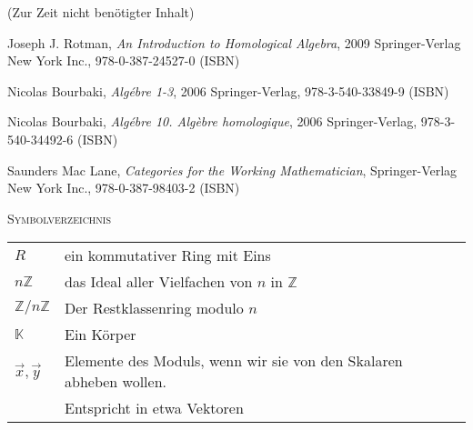 \documentclass[a4paper]{amsart}
\theoremstyle{definition}
\newcommand{\Z}{\ensuremath{\mathbb{ Z }}}
\newcommand{\K}{\ensuremath{\mathbb{ K }}}
\newcommand{\zz}[1]{\ensuremath{\Z /#1\Z}}
\begin{document}
\begin{backup}
    (Zur Zeit nicht benötigter Inhalt)
\end{backup}

\begin{thebibliography}{9}
   	Joseph J. Rotman, \emph{An Introduction to Homological Algebra},
   	2009 Springer-Verlag New York Inc., 978-0-387-24527-0 (ISBN)

      Nicolas Bourbaki, \emph{Algébre 1-3},
      2006 Springer-Verlag, 978-3-540-33849-9 (ISBN)

      Nicolas Bourbaki, \emph{Algébre 10. Algèbre homologique},
      2006 Springer-Verlag, 978-3-540-34492-6 (ISBN)
      
      Saunders Mac Lane, \emph{Categories for the Working Mathematician},
      Springer-Verlag New York Inc., 978-0-387-98403-2 (ISBN)

\end{thebibliography}

\begin{large}
    \centerline{\textsc{Symbolverzeichnis}}
\end{large}
\bigskip

\renewcommand*{\arraystretch}{1}

\begin{tabular}{ll}
    $R$                                 & ein kommutativer Ring mit Eins\\
    $n\Z$                               & das Ideal aller Vielfachen von $n$ in $\Z$\\
    $\zz{n}$                            & Der Restklassenring modulo $n$\\
    $\K$                                & Ein Körper\\
    $\vec x, \vec y$                    & Elemente des Moduls, wenn wir sie von den Skalaren abheben wollen. \\& Entspricht in etwa Vektoren
\end{tabular}
\end{document}
